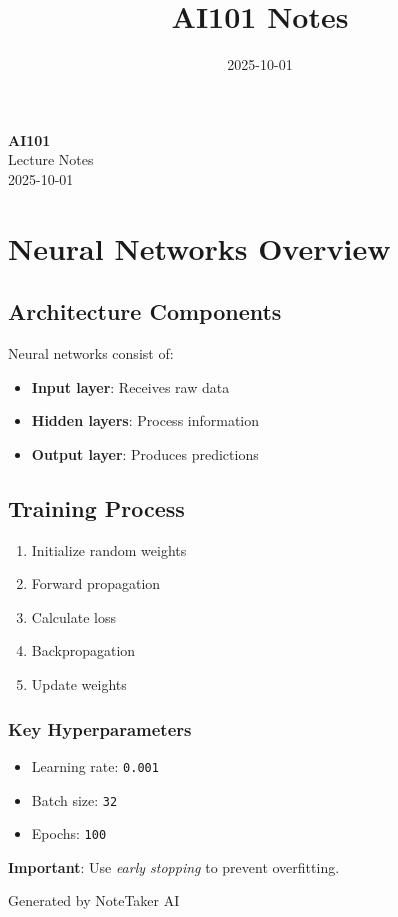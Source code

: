 \documentclass[11pt,a4paper]{article}
\title{\textcolor{primarycolor}{\Huge\textbf{AI101 Notes}}}
\author{}
\date{\textcolor{secondarycolor}{2025-10-01}}
\begin{document}
\begin{center}
    \colorbox{secondarycolor!10}{%
        \parbox{0.95\textwidth}{%
            \centering
            \vspace{0.5cm}
            {\Huge\textcolor{primarycolor}{\textbf{AI101}}} \\[0.5cm]
            {\Large Lecture Notes} \\[0.3cm]
            {\large\textcolor{secondarycolor}{2025-10-01}}
            \vspace{0.5cm}
        }
    }
\end{center}

\vspace{1cm}

\section*{Neural Networks Overview}

\subsection*{Architecture Components}

Neural networks consist of:
\begin{itemize}
  \item \textbf{Input layer}: Receives raw data
  \item \textbf{Hidden layers}: Process information
  \item \textbf{Output layer}: Produces predictions
\end{itemize}

\subsection*{Training Process}

\begin{enumerate}
  \item Initialize random weights
  \item Forward propagation
  \item Calculate loss
  \item Backpropagation
  \item Update weights
\end{enumerate}

\subsubsection*{Key Hyperparameters}
\begin{itemize}
  \item Learning rate: \texttt{0.001}
  \item Batch size: \texttt{32}
  \item Epochs: \texttt{100}
\end{itemize}

\textbf{Important}: Use \textit{early stopping} to prevent overfitting.


\vspace{1cm}

\begin{center}
\textcolor{secondarycolor}{\small Generated by NoteTaker AI}
\end{center}
\end{document}
